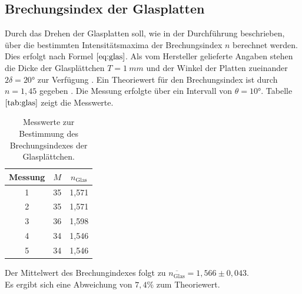 \subsection{Brechungsindex der Glasplatten}
Durch das Drehen der Glasplatten soll, wie in der Durchführung beschrieben, über die bestimmten Intensitätsmaxima
der Brechungsindex $n$ berechnet werden.
Dies erfolgt nach Formel $\ref{eq:glas}$.
Als vom Hersteller gelieferte Angaben stehen die Dicke der Glasplättchen $T=\SI{1}{mm}$ und der Winkel der Platten zueinander $2\delta=20°$ zur Verfügung \cite{anleitung}.
Ein Theoriewert für den Brechungsindex ist durch $n= 1,45$ gegeben \cite{brechglas}.
Die Messung erfolgte über ein Intervall von $\theta = 10°$.
Tabelle $\ref{tab:glas}$ zeigt die Messwerte.

\begin{table}[H]
\centering
\begin{tabular}{c c c}
{Messung} & {$M$} & {$n_\text{Glas}$} \\
\midrule
1 & 35 & 1,571 \\
2 & 35 & 1,571 \\
3 & 36 & 1,598 \\
4 & 34 & 1,546 \\
5 & 34 & 1,546 \\
\end{tabular}
\caption{Messwerte zur Bestimmung des Brechungsindexes der Glasplättchen.}
\label{tab:glas}
\end{table}
Der Mittelwert des Brechungindexes folgt zu $\overline{n_\text{Glas}}=1,566 \pm 0,043$.\\
Es ergibt sich eine Abweichung von $7,4 \%$ zum Theoriewert.

